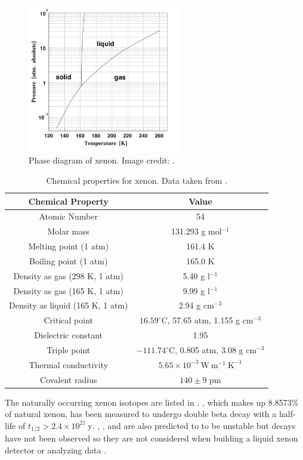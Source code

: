 \begin{figure}
\includegraphics[width=0.6\textwidth]{PhaseDiagram}
\caption{Phase diagram of xenon.  Image credit: .}
\label{fig:phase_diagram}
\end{figure}
 
\begin{table}[t]
 \centering
 \begin{tabular}{cc}
 \hline
 \hline
 Chemical Property & Value \\
 \hline
 Atomic Number & 54 \\
 Molar mass & 131.293 g mol$^{-1}$ \\
 Melting point (1 atm) & 161.4 K \\
 Boiling point (1 atm) & 165.0 K \\
 Density as gas (298 K, 1 atm)  &  5.40 g l$^{-1}$ \\
 Density as gas (165 K, 1 atm)  &  9.99 g l$^{-1}$ \\
 Density as liquid (165 K, 1 atm) & 2.94 g cm$^{-3}$ \\
 Critical point & $16.59^{\circ}$C, 57.65 atm, 1.155 g cm$^{-3}$ \\
 Dielectric constant & 1.95 \\
 Triple point & $-111.74^{\circ}$C, 0.805 atm, 3.08 g cm$^{-3}$ \\
 Thermal conductivity & $5.65 \times 10^{-3}\ \mathrm{W\ m^{-1}\ K^{-1}}$ \\
 Covalent radius & $140 \pm 9$ pm \\
 \hline
 \hline
 \end{tabular}
 \caption{Chemical properties for xenon.  Data taken from .}
\label{tab:xe_properties}
\end{table}

The naturally occurring xenon isotopes are listed in .  , which makes up 8.8573\% of natural xenon,
has been measured to undergo double beta decay with a half-life of $t_{1/2} > 2.4 \times 10^{21}\ \mathrm{y}$.  ,
,
and  are also predicted to to be unstable but decays have not been observed so they are not considered when building a
liquid xenon detector or analyzing data .

